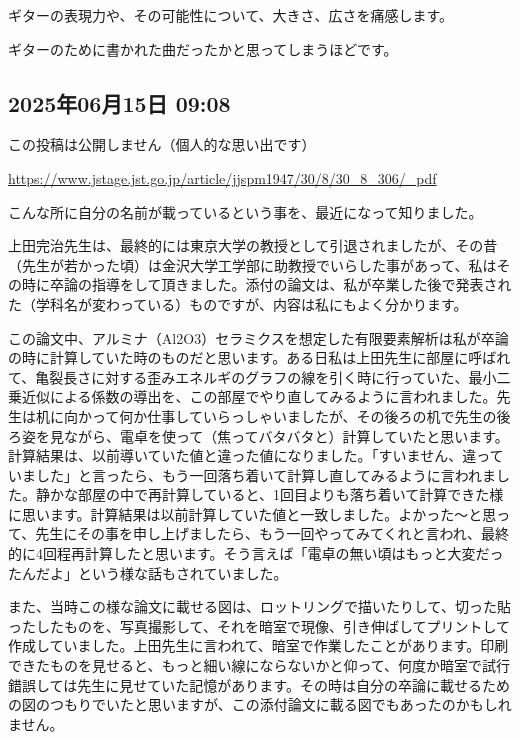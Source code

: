 \documentclass[facebook_diary.tex]{subfiles}
\begin{document}
ギターの表現力や、その可能性について、大きさ、広さを痛感します。

ギターのために書かれた曲だったかと思ってしまうほどです。

\subsection*{2025年06月15日 09:08}

この投稿は公開しません（個人的な思い出です）


\url{https://www.jstage.jst.go.jp/article/jjspm1947/30/8/30_8_306/_pdf}




こんな所に自分の名前が載っているという事を、最近になって知りました。


上田完治先生は、最終的には東京大学の教授として引退されましたが、その昔（先生が若かった頃）は金沢大学工学部に助教授でいらした事があって、私はその時に卒論の指導をして頂きました。添付の論文は、私が卒業した後で発表された（学科名が変わっている）ものですが、内容は私にもよく分かります。


この論文中、アルミナ（Al2O3）セラミクスを想定した有限要素解析は私が卒論の時に計算していた時のものだと思います。ある日私は上田先生に部屋に呼ばれて、亀裂長さに対する歪みエネルギのグラフの線を引く時に行っていた、最小二乗近似による係数の導出を、この部屋でやり直してみるように言われました。先生は机に向かって何か仕事していらっしゃいましたが、その後ろの机で先生の後ろ姿を見ながら、電卓を使って（焦ってバタバタと）計算していたと思います。計算結果は、以前導いていた値と違った値になりました。「すいません、違っていました」と言ったら、もう一回落ち着いて計算し直してみるように言われました。静かな部屋の中で再計算していると、1回目よりも落ち着いて計算できた様に思います。計算結果は以前計算していた値と一致しました。よかった〜と思って、先生にその事を申し上げましたら、もう一回やってみてくれと言われ、最終的に4回程再計算したと思います。そう言えば「電卓の無い頃はもっと大変だったんだよ」という様な話もされていました。


また、当時この様な論文に載せる図は、ロットリングで描いたりして、切った貼ったしたものを、写真撮影して、それを暗室で現像、引き伸ばしてプリントして作成していました。上田先生に言われて、暗室で作業したことがあります。印刷できたものを見せると、もっと細い線にならないかと仰って、何度か暗室で試行錯誤しては先生に見せていた記憶があります。その時は自分の卒論に載せるための図のつもりでいたと思いますが、この添付論文に載る図でもあったのかもしれません。
\end{document}
